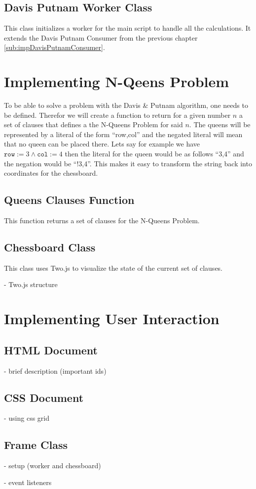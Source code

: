 \subsection{Davis Putnam Worker Class}
\label{sub:impDavisPutnamWorker}
This class initializes a worker for the main script to handle all the calculations. It extends the Davis Putnam Consumer from the previous chapter \ref{sub:impDavisPutnamConsumer}.

\section{Implementing N-Qeens Problem}
\label{sec:impQueens}
To be able to solve a problem with the Davis \& Putnam algorithm, one needs to be defined. Therefor we will create a function to return for a given number $n$ a set of clauses that defines a the N-Queens Problem for said $n$. The queens will be represented by a literal of the form ``row,col'' and the negated literal will mean that no queen can be placed there. Lets say for example we have $\texttt{row} := 3 \land \texttt{col} := 4$ then the literal for the queen would be as follows ``3,4'' and the negation would be ``!3,4''. This makes it easy to transform the string back into coordinates for the chessboard.

\subsection{Queens Clauses Function}
\label{sub:impQueensClauses}
This function returns a set of clauses for the N-Queens Problem.

\subsection{Chessboard Class}
\label{sub:impChessboard}
This class uses Two.js to visualize the state of the current set of clauses.

- Two.js structure

\section{Implementing User Interaction}
\label{sec:impUI}

\subsection{HTML Document}
\label{sub:impHTML}

- brief description (important ids)

\subsection{CSS Document}
\label{sub:impCSS}

- using css grid

\subsection{Frame Class}
\label{sub:impFrame}

- setup (worker and chessboard)

- event listeners